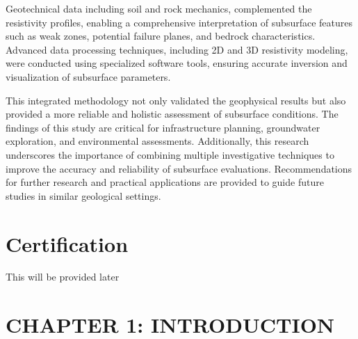 \documentclass[12pt,a4paper]{report}
\begin{document}

Geotechnical data including soil and rock mechanics, complemented the resistivity profiles, enabling a comprehensive interpretation of subsurface features such as weak zones, potential failure planes, and bedrock characteristics. Advanced data processing techniques, including 2D and 3D resistivity modeling, were conducted using specialized software tools, ensuring accurate inversion and visualization of subsurface parameters.

This integrated methodology not only validated the geophysical results but also provided a more reliable and holistic assessment of subsurface conditions. The findings of this study are critical for infrastructure planning, groundwater exploration, and environmental assessments. Additionally, this research underscores the importance of combining multiple investigative techniques to improve the accuracy and reliability of subsurface evaluations. Recommendations for further research and practical applications are provided to guide future studies in similar geological settings.

\listoffigures
{}

\listoftables
{}

\tableofcontents

\chapter*{Certification}
\justifying
This will be provided later

\newpage


\chapter{CHAPTER 1: INTRODUCTION}
\end{document}
